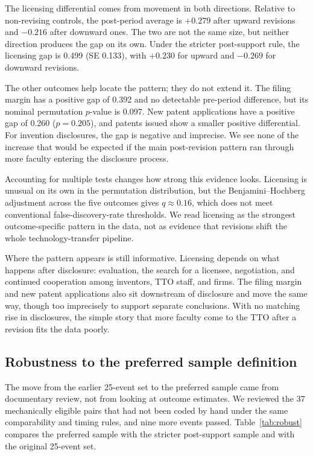 The licensing differential comes from movement in both directions. Relative to non-revising controls, the post-period average is $+0.279$ after upward revisions and $-0.216$ after downward ones. The two are not the same size, but neither direction produces the gap on its own. Under the stricter post-support rule, the licensing gap is 0.499 (SE 0.133), with $+0.230$ for upward and $-0.269$ for downward revisions.

The other outcomes help locate the pattern; they do not extend it. The filing margin has a positive gap of 0.392 and no detectable pre-period difference, but its nominal permutation $p$-value is 0.097. New patent applications have a positive gap of 0.260 ($p=0.205$), and patents issued show a smaller positive differential. For invention disclosures, the gap is negative and imprecise. We see none of the increase that would be expected if the main post-revision pattern ran through more faculty entering the disclosure process.

Accounting for multiple tests changes how strong this evidence looks. Licensing is unusual on its own in the permutation distribution, but the Benjamini--Hochberg adjustment across the five outcomes gives $q\approx0.16$, which does not meet conventional false-discovery-rate thresholds. We read licensing as the strongest outcome-specific pattern in the data, not as evidence that revisions shift the whole technology-transfer pipeline.

Where the pattern appears is still informative. Licensing depends on what happens after disclosure: evaluation, the search for a licensee, negotiation, and continued cooperation among inventors, TTO staff, and firms. The filing margin and new patent applications also sit downstream of disclosure and move the same way, though too imprecisely to support separate conclusions. With no matching rise in disclosures, the simple story that more faculty come to the TTO after a revision fits the data poorly.

\subsection*{Robustness to the preferred sample definition}

The move from the earlier 25-event set to the preferred sample came from documentary review, not from looking at outcome estimates. We reviewed the 37 mechanically eligible pairs that had not been coded by hand under the same comparability and timing rules, and nine more events passed. Table~\ref{tab:robust} compares the preferred sample with the stricter post-support sample and with the original 25-event set.

